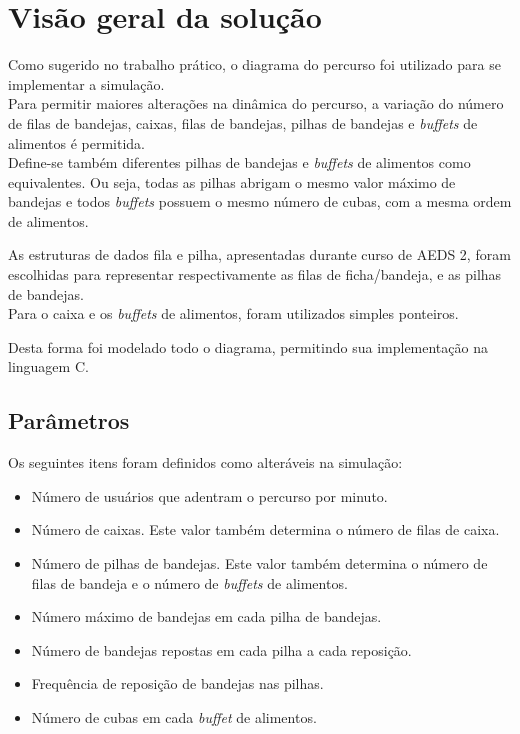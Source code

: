 \documentclass{article}
\begin{document}
\section{Visão geral da solução}
Como sugerido no trabalho prático, o diagrama do percurso foi utilizado para se implementar a simulação.\\
Para permitir maiores alterações na dinâmica do percurso, a variação do número de filas de bandejas, caixas, filas de bandejas, pilhas de bandejas e \textit{buffets} de alimentos é permitida.\\
Define-se também diferentes pilhas de bandejas e \textit{buffets} de alimentos como equivalentes. Ou seja, todas as pilhas abrigam o mesmo valor máximo de bandejas e todos \textit{buffets} possuem o mesmo número de cubas, com a mesma ordem de alimentos.

As estruturas de dados fila e pilha, apresentadas durante curso de AEDS 2, foram escolhidas para representar respectivamente as filas de ficha/bandeja, e as pilhas de bandejas.\\
Para o caixa e os \textit{buffets} de alimentos, foram utilizados simples ponteiros.

Desta forma foi modelado todo o diagrama, permitindo sua implementação na linguagem C.

\subsection{Parâmetros}
\label{ssec:params}
Os seguintes itens foram definidos como alteráveis na simulação:
\begin{itemize}
  \setlength\itemsep{2px}
  \item Número de usuários que adentram o percurso por minuto.
  \item Número de caixas. Este valor também determina o número de filas de caixa.
  \item Número de pilhas de bandejas. Este valor também determina o número de filas de bandeja e o número de \textit{buffets} de alimentos.
  \item Número máximo de bandejas em cada pilha de bandejas.
  \item Número de bandejas repostas em cada pilha a cada reposição.
  \item Frequência de reposição de bandejas nas pilhas.
  \item Número de cubas em cada \textit{buffet} de alimentos.
\end{itemize}
\end{document}
